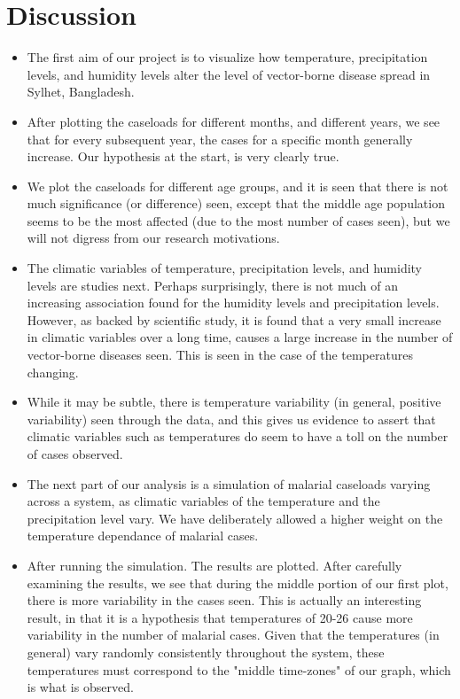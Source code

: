 \documentclass[fontsize=11pt]{article}
\begin{document}
    \section*{Discussion}

    \begin{itemize}
        \item The first aim of our project is to visualize how temperature, precipitation levels, and humidity levels alter the level of vector-borne disease spread in Sylhet, Bangladesh.

        \item After plotting the caseloads for different months, and different years, we see that for every subsequent year, the cases for a specific month generally increase. Our hypothesis at the start, is very clearly true.

        \item We plot the caseloads for different age groups, and it is seen that there is not much significance (or difference) seen, except that the middle age population seems to be the most affected (due to the most number of cases seen), but we will not digress from our research motivations.

        \item The climatic variables of temperature, precipitation levels, and humidity levels are studies next. Perhaps surprisingly, there is not much of an increasing association found for the humidity levels and precipitation levels. However, as backed by scientific study, it is found that a very small increase in climatic variables over a long time, causes a large increase in the number of vector-borne diseases seen. This is seen in the case of the temperatures changing.

        \item While it may be subtle, there is temperature variability (in general, positive variability) seen through the data, and this gives us evidence to assert that climatic variables such as temperatures do seem to have a toll on the number of cases observed.

        \item The next part of our analysis is a simulation of malarial caseloads varying across a system, as climatic variables of the temperature and the precipitation level vary. We have deliberately allowed a higher weight on the temperature dependance of malarial cases.

        \item After running the simulation. The results are plotted. After carefully examining the results, we see that during the middle portion of our first plot, there is more variability in the cases seen. This is actually an interesting result, in that it is a hypothesis that temperatures of 20-26 cause more variability in the number of malarial cases. Given that the temperatures (in general) vary randomly consistently throughout the system, these temperatures must correspond to the "middle time-zones" of our graph, which is what is observed.


\end{itemize}
\end{document}
